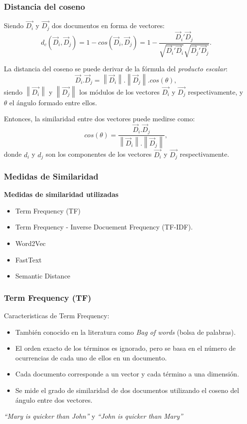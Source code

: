 \begin{frame}[allowframebreaks]
	\frametitle{Distancia del coseno}
	Siendo \(\overrightarrow{D_i}\) y \(\overrightarrow{D_j}\) dos documentos en forma de vectores:
	\[d_c(\vec{D}_i, \vec{D}_j) = 1 - cos(\vec{D}_i, \vec{D}_j) = 1 - \frac{{\vec{D}_i}'\vec{D}_j}{\sqrt{{\vec{D}_i}'\vec{D}_i}\sqrt{{\vec{D}_j}'\vec{D}_j}}.\]

	\bigskip
	La distancia del coseno se puede derivar de la fórmula del \textit{producto escalar}:
	\[\vec{D}_i.\vec{D}_j = \left \| \vec{D}_i \right \|.\left \| \vec{D}_j \right \|.cos(\theta),\]
	siendo \(\left \|\overrightarrow{D_i}\right \|\) y \(\left \|\overrightarrow{D_j}\right \|\) los módulos de los vectores \(\overrightarrow{D_i}\) y \(\overrightarrow{D_j}\) respectivamente, y $\theta$ el ángulo formado entre ellos.

	\framebreak

	Entonces, la similaridad entre dos vectores puede medirse como:
	\[cos(\theta) = \frac{\vec{D}_i.\vec{D}_j}{\left \| \vec{D}_i \right \|.\left \| \vec{D}_j \right \|},\]
	donde \(d_i\) y \(d_j\) son los componentes de los vectores \(\overrightarrow{D_i}\) y \(\overrightarrow{D_j}\) respectivamente.
\end{frame}

\begin{frame}
	\frametitle{Medidas de Similaridad}
	\textbf{Medidas de similaridad utilizadas}
	\bigskip
	\begin{itemize}[<*>]
		\item Term Frequency (TF)
		\item Term Frequency - Inverse Docuement Frequency (TF-IDF).
		\item Word2Vec
		\item FastText
		\item Semantic Distance
	\end{itemize}
\end{frame}

\begin{frame}
	\frametitle{Term Frequency (TF)}
	Caracteristicas de Term Frequency:
	\bigskip
	\begin{itemize}[<*>]
		\item También conocido en la literatura como \textit{Bag of words} (bolsa de palabras).
		\item El orden exacto de los términos es ignorado, pero se basa en el número de ocurrencias de cada uno de ellos en un documento.
		\item Cada documento corresponde a un vector y cada término a una dimensión.
		\item Se mide el grado de similaridad de dos documentos utilizando el coseno del ángulo entre dos vectores.
	\end{itemize}

	\bigskip
	\centering
	\textit{“Mary is quicker than John”} y \textit{“John is quicker than Mary”}
\end{frame}

